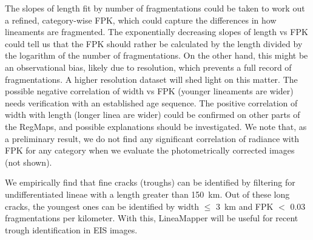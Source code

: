 The slopes of length fit by number of fragmentations could be taken to work out a refined, category-wise FPK, which could capture the differences in how lineaments are fragmented. The exponentially decreasing slopes of length vs FPK could tell us that the FPK should rather be calculated by the length divided by the logarithm of the number of fragmentations. On the other hand, this might be an observational bias, likely due to resolution, which prevents a full record of fragmentations. A higher resolution dataset will shed light on this matter. The possible negative correlation of width vs FPK (younger lineaments are wider) needs verification with an established age sequence. The positive correlation of width with length (longer linea are wider) could be confirmed on other parts of the RegMaps, and possible explanations should be investigated.
We note that, as a preliminary result, we do not find any significant correlation of radiance with FPK for any category when we evaluate the photometrically corrected images (not shown).

We empirically find that fine cracks (troughs) can be identified by filtering for undifferentiated lineae with a length greater than 150~km. Out of these long cracks, the youngest ones can be identified by width $\leq$ 3~km and FPK $<$ 0.03 fragmentations per kilometer. With this, LineaMapper will be useful for recent trough identification in EIS images.





